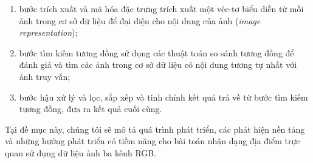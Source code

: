\begin{enumerate}
    \item bước trích xuất và mã hóa đặc trưng trích xuất một véc-tơ biểu diễn từ mỗi ảnh trong cơ sở dữ liệu để đại diện cho nội dung của ảnh (\textit{image representation});
    \item bước tìm kiếm tương đồng sử dụng các thuật toán so sánh tương đồng để đánh giá và tìm các ảnh trong cơ sở dữ liệu có nội dung tương tự nhất với ảnh truy vấn;
    \item bước hậu xử lý và lọc, sắp xếp và tinh chỉnh kết quả trả về từ bước tìm kiếm tương đồng, đưa ra kết quả cuối cùng.
\end{enumerate}

Tại đề mục này, chúng tôi sẽ mô tả quá trình phát triển, các phát hiện nền tảng và những hướng phát triển có tiềm năng cho bài toán nhận dạng địa điểm trực quan sử dụng dữ liệu ảnh ba kênh RGB.













